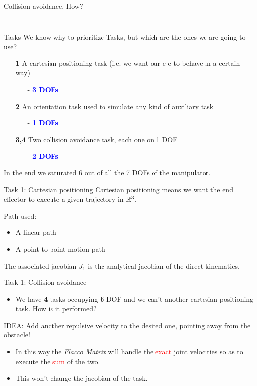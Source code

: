 \documentclass[11pt]{beamer}
\newcommand{\dof}[1]{\begin{itemize}
\item[-]\textcolor{blue}{\textbf{#1 DOFs}}
\end{itemize}}
\begin{document}
\begin{frame}{Collision avoidance. How?}
\begin{columns}
\begin{column}{.5\textwidth}
\begin{figure}[H]
\end{figure}
\end{column}
\end{columns}
\end{frame}

\begin{frame}{Tasks}
We know why to prioritize Tasks, but which are the ones we are going to use?
\begin{itemize}
\item[\textbf{1}] A cartesian positioning task (i.e. we want our e-e to behave in a certain way)
\dof{3}
\item[\textbf{2}] An orientation task used to simulate any kind of auxiliary task
\dof{1}
\item[\textbf{3,4}] Two collision avoidance task, each one on 1 DOF
\dof{2}
\end{itemize}
In the end we saturated 6 out of all the 7 DOFs of the manipulator.
\end{frame}

\begin{frame}{Task 1: Cartesian positioning}
Cartesian positioning means we want the end effector to execute a given trajectory  in $\Bbb R^3$.

\begin{block}{Path used:}
\begin{itemize}
\item A linear path
\item A point-to-point motion path
\end{itemize}
\end{block}

The associated jacobian $J_1$ is the analytical jacobian of the direct kinematics.
\end{frame}

\begin{frame}{Task 1: Collision avoidance}
\begin{itemize}
\item We have \textbf{4} tasks occupying \textbf{6} DOF and we can't another cartesian positioning task. How is it performed?
\end{itemize}
\begin{block}{IDEA:}
Add another repulsive velocity to the desired one, pointing away from the obstacle! 
\end{block}
\begin{itemize}
\item In this way the \emph{Flacco Matrix} will handle the \textcolor{red}{exact} joint velocities so as to execute the \textcolor{red}{sum} of the two.
\item This won't change the jacobian of the task.
\end{itemize}
\end{frame}
\end{document}
